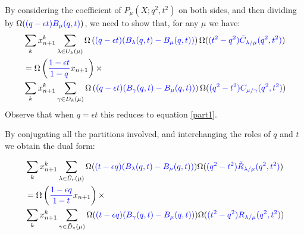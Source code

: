 \documentclass[12pt,dvips]{amsart}
\begin{document}
\bigskip\bigskip
\noindent
By considering the coefficient of $P_\mu(X;q^2,t^2)$ on both sides, and then dividing by $\Omega({\color{blue}(q-\epsilon t)B_\mu(q,t)})$, we need to show that, for any $\mu$ we have:
\begin{align*}
&\sum_k x_{n+1}^k \sum_{\lambda \in U_k(\mu)} \Omega \left ( {\color{blue}(q - \epsilon t) (B_\lambda(q,t) - B_\mu(q,t))}\right ) \Omega({\color{blue}(t^2 - q^2) \tilde{C}_{\lambda / \mu}(q^2,t^2)}) \\
&= \Omega \left ( {\color{blue}\frac{1-\epsilon t}{1-q}} x_{n+1} \right ) \times
\\
&\sum_k x_{n+1}^k \sum_{\gamma \in D_k(\mu)} \Omega \left ( {\color{blue}(q - \epsilon t) (B_\gamma(q,t) - B_\mu(q,t))}\right ) \Omega ( {\color{blue}(q^2 - t^2) C_{\mu / \gamma}(q^2,t^2)})
\end{align*}
Observe that when $q = \epsilon t$ this reduces to equation \eqref{part1}. 

\medskip
\noindent
By conjugating all the partitions involved, and interchanging the roles of $q$ and $t$ we obtain the dual form:

\begin{align*}
&\sum_k x_{n+1}^k \sum_{\lambda \in \tilde{U}_r(\mu)} \Omega({\color{blue}(t-\epsilon q) (B_\lambda(q,t) - B_\mu(q,t))}) \Omega({\color{blue}(q^2 - t^2) \tilde{R}_{\lambda / \mu}(q^2, t^2)}) \\
&= \Omega \left ( {\color{blue}\frac{1-\epsilon q}{1-t}} x_{n+1} \right ) \times \\
&\sum_k x_{n+1}^k  \sum_{\gamma \in \tilde{D}_z(\mu)} \Omega({\color{blue}(t-\epsilon q)(B_\gamma(q,t) - B_\mu(q,t))}) \Omega({\color{blue}(t^2 - q^2) R_{\lambda / \mu}(q^2,t^2)})
\end{align*}

\end{document}
